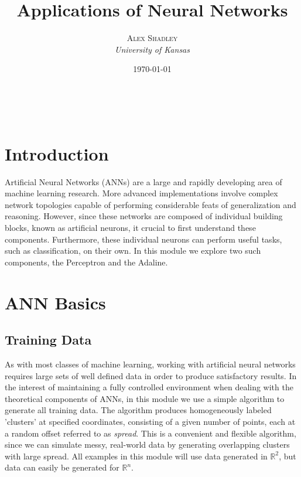 \documentclass[a4paper, 11pt]{article} %
\title{\textbf{Applications of Neural Networks}} %
\author{\textsc{Alex Shadley} %
\\{\textit{University of Kansas}}} %
\date{\today} %
\makeatletter
\renewcommand{\maketitle}{ %
\begin{flushright} %
{\LARGE\@title} %

\vspace{50pt} %

{\large\@author} %
\\\@date %

\vspace{40pt} %
\end{flushright}
}
\makeatother
\begin{document}
\maketitle %


\section*{Introduction}

Artificial Neural Networks (ANNs) are a large and rapidly developing area of machine learning research.  More advanced implementations involve complex network topologies capable of performing considerable feats of generalization and reasoning.  However, since these networks are composed of individual building blocks, known as artificial neurons, it crucial to first understand these components.  Furthermore, these individual neurons can perform useful tasks, such as classification, on their own.  In this module we explore two such components, the Perceptron and the Adaline.

\section*{ANN Basics}

\subsection*{Training Data}

As with most classes of machine learning, working with artificial neural networks requires large sets of well defined data in order to produce satisfactory results.  In the interest of maintaining a fully controlled environment when dealing with the theoretical components of ANNs, in this module we use a simple algorithm to generate all training data.  The algorithm produces homogeneously labeled 'clusters' at specified coordinates, consisting of a given number of points, each at a random offset referred to as \textit{spread}.  This is a convenient and flexible algorithm, since we can simulate messy, real-world data by generating overlapping clusters with large spread.  All examples in this module will use data generated in $\mathbb{R}^2$, but data can easily be generated for $\mathbb{R}^n$.
\end{document}
